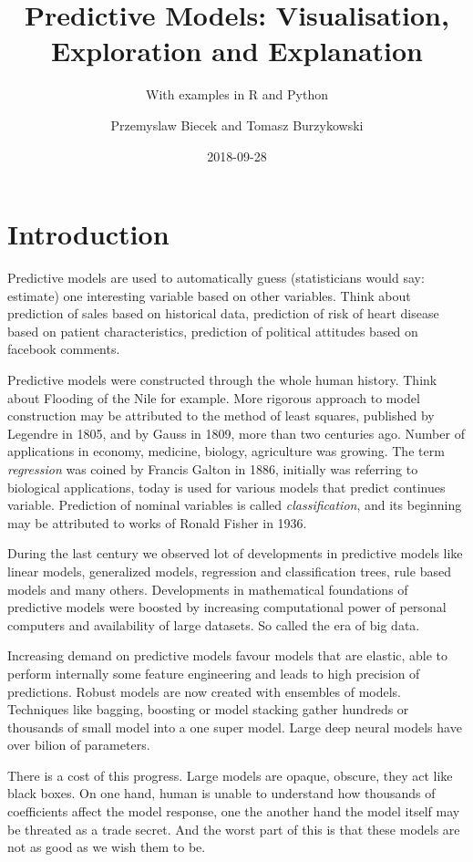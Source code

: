 \documentclass[]{krantz}
\title{Predictive Models: Visualisation, Exploration and Explanation}
\subtitle{With examples in R and Python}
\author{Przemyslaw Biecek and Tomasz Burzykowski}
\date{2018-09-28}
\theoremstyle{definition}
\theoremstyle{definition}
\theoremstyle{definition}
\theoremstyle{remark}
\begin{document}
\maketitle

{
\hypersetup{linkcolor=black}
\setcounter{tocdepth}{2}
\tableofcontents
}
\listoftables
\listoffigures
\hypertarget{introduction}{%
\section{Introduction}\label{introduction}}

Predictive models are used to automatically guess (statisticians would
say: estimate) one interesting variable based on other variables. Think
about prediction of sales based on historical data, prediction of risk
of heart disease based on patient characteristics, prediction of
political attitudes based on facebook comments.

Predictive models were constructed through the whole human history.
Think about Flooding of the Nile for example. More rigorous approach to
model construction may be attributed to the method of least squares,
published by Legendre in 1805, and by Gauss in 1809, more than two
centuries ago. Number of applications in economy, medicine, biology,
agriculture was growing. The term \emph{regression} was coined by
Francis Galton in 1886, initially was referring to biological
applications, today is used for various models that predict continues
variable. Prediction of nominal variables is called
\emph{classification}, and its beginning may be attributed to works of
Ronald Fisher in 1936.

During the last century we observed lot of developments in predictive
models like linear models, generalized models, regression and
classification trees, rule based models and many others. Developments in
mathematical foundations of predictive models were boosted by increasing
computational power of personal computers and availability of large
datasets. So called the era of big data.

Increasing demand on predictive models favour models that are elastic,
able to perform internally some feature engineering and leads to high
precision of predictions. Robust models are now created with ensembles
of models. Techniques like bagging, boosting or model stacking gather
hundreds or thousands of small model into a one super model. Large deep
neural models have over bilion of parameters.

There is a cost of this progress. Large models are opaque, obscure, they
act like black boxes. On one hand, human is unable to understand how
thousands of coefficients affect the model response, one the another
hand the model itself may be threated as a trade secret. And the worst
part of this is that these models are not as good as we wish them to be.
\end{document}
